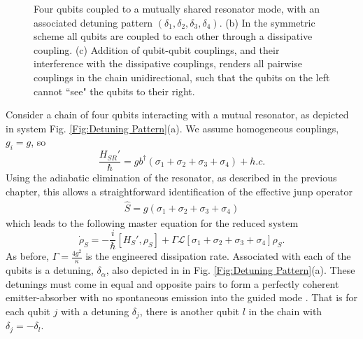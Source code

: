 \begin{figure}
{
}
\caption{Four qubits coupled to a mutually shared resonator mode, with an associated detuning pattern $( \delta_1 , \delta_2 , \delta_3 , \delta_4)$. (b) In the symmetric scheme all qubits are coupled to each other through a dissipative coupling. (c) Addition of qubit-qubit couplings, and their interference with the dissipative couplings, renders all pairwise couplings in the chain unidirectional, such that the qubits on the left cannot ``see" the qubits to their right.}
\end{figure}
%
Consider a chain of four qubits interacting with a mutual resonator, as depicted in  system Fig. \ref{Fig:Detuning Pattern}(a). We assume homogeneous couplings, $g_i=g$, so
%
\begin{equation}
    \frac{H_{SR}'}{\hbar} = g b^\dagger ( \sigma_1 + \sigma_2 + \sigma_3 + \sigma_4) + h.c.
\end{equation}
%
Using the adiabatic elimination of the resonator, as described in the previous chapter, this allows a straightforward identification of the effective junp operator
%
\begin{eqnarray}
    \hat{S} = g ( \sigma_1 + \sigma_2 + \sigma_3 + \sigma_4)
\end{eqnarray}
%
which leads to the following master equation for the reduced system
%
\begin{equation}\label{four qubit}
    \dot{\rho}_S = - \frac{i}{\hbar} [H_S' , \rho_S] + \Gamma \mathcal{L}[\sigma_1 + \sigma_2 + \sigma_3 + \sigma_4] \rho_S.
\end{equation}
%
As before, $\Gamma = \frac{4g^2}{\kappa}$ is the engineered dissipation rate. Associated with each of the qubits is a detuning, $\delta_\alpha$, also depicted in in Fig. \ref{Fig:Detuning Pattern}(a). These detunings must come in equal and opposite pairs to form a perfectly coherent emitter-absorber with no spontaneous emission into the guided mode \cite{Cascade_Quantum_Systems}. That is for each qubit $j$ with a detuning $\delta_j$, there is another qubit $l$ in the chain with $\delta_j = - \delta_l$. 
